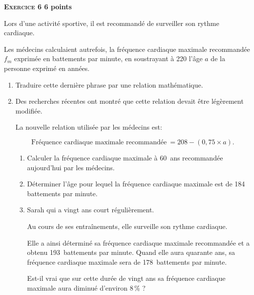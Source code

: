 \textbf{\textsc{Exercice 6} \hfill 6 points}

\medskip

Lors d'une activité sportive, il est recommandé de surveiller son rythme cardiaque.

Les médecins calculaient autrefois, la fréquence cardiaque maximale recommandée $f_m$ exprimée en battements par minute, en soustrayant à 220 l'âge $a$ de la personne exprimé en années. 

\medskip

\begin{enumerate}
\item Traduire cette dernière phrase par une relation mathématique. 
\item Des recherches récentes ont montré que cette relation devait être légèrement modifiée. 

La nouvelle relation utilisée par les médecins est: 

\[\text{Fréquence cardiaque maximale recommandée}\: = 208 - (0,75 \times a).\] 

	\begin{enumerate}
		\item Calculer la fréquence cardiaque maximale à 60~ans recommandée aujourd'hui par les médecins. 
		\item Déterminer l'âge pour lequel la fréquence cardiaque maximale est de 184 battements par minute. 
		\item Sarah qui a vingt ans court régulièrement.
		
Au cours de ses entraînements, elle surveille son rythme cardiaque. 

Elle a ainsi déterminé sa fréquence cardiaque maximale recommandée et a obtenu 193~battements par minute. Quand elle aura quarante ans, sa fréquence cardiaque maximale sera de 178~battements par minute. 

Est-il vrai que sur cette durée de vingt ans sa fréquence cardiaque maximale aura diminué d'environ 8\,\% ?
	\end{enumerate} 
\end{enumerate}

\vspace{0,5cm}

